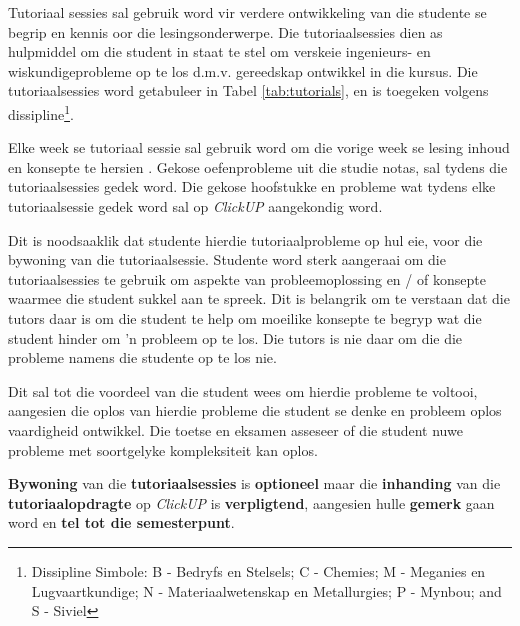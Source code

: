 	Tutoriaal sessies sal gebruik word vir verdere ontwikkeling
        van die studente se begrip en kennis oor die
        lesingsonderwerpe.  Die tutoriaalsessies dien as hulpmiddel om
        die student in staat te stel om verskeie ingenieurs- en
        wiskundigeprobleme op te los d.m.v. gereedskap ontwikkel in
        die kursus. Die tutoriaalsessies word getabuleer in Tabel
        \ref{tab:tutorials}, en is toegeken volgens
        dissipline\footnote{Dissipline Simbole: B - Bedryfs en
          Stelsels; C - Chemies; M - Meganies en Lugvaartkundige; N -
          Materiaalwetenskap en Metallurgies; P - Mynbou; and S -
          Siviel}.

          Elke week se tutoriaal sessie sal gebruik word om die vorige
          week se lesing inhoud en konsepte te hersien . Gekose
          oefenprobleme uit die studie notas, sal tydens die
          tutoriaalsessies gedek word. Die gekose hoofstukke en
          probleme wat tydens elke tutoriaalsessie gedek word sal op
          {\it ClickUP} aangekondig word.

          Dit is noodsaaklik dat studente hierdie tutoriaalprobleme op
          hul eie, voor die bywoning van die tutoriaalsessie. Studente
          word sterk aangeraai om die tutoriaalsessies te gebruik om
          aspekte van probleemoplossing en / of konsepte waarmee die
          student sukkel aan te spreek. Dit is belangrik om te
          verstaan dat die tutors daar is om die student te help om
          moeilike konsepte te begryp wat die student hinder om 'n
          probleem op te los. Die tutors is nie daar om die die
          probleme namens die studente op te los nie.

          Dit sal tot die voordeel van die student wees om hierdie
          probleme te voltooi, aangesien die oplos van hierdie
          probleme die student se denke en probleem oplos vaardigheid
          ontwikkel.  Die toetse en eksamen asseseer of die student
          nuwe probleme met soortgelyke kompleksiteit kan oplos.

        \textbf{Bywoning} van die \textbf{tutoriaalsessies}
        is \textbf{optioneel} maar die \textbf{inhanding} van die
        \textbf{tutoriaalopdragte} op {\it ClickUP} is 
        \textbf{verpligtend}, aangesien hulle \textbf{gemerk} gaan
        word en \textbf{tel tot die semesterpunt}.

	

